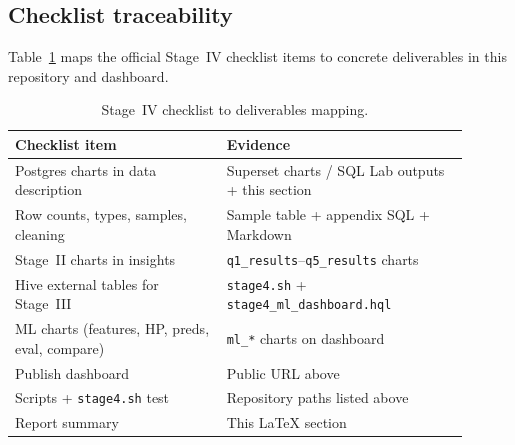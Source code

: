 \subsection{Checklist traceability}
Table~\ref{tab:stage4-checklist} maps the official Stage~IV checklist items to concrete deliverables in this repository and dashboard.

\begin{table}[htbp]
  \centering
  \begin{tabular}{p{0.42\linewidth}p{0.48\linewidth}}
    \toprule
    Checklist item & Evidence \\
    \midrule
    Postgres charts in data description & Superset charts / SQL Lab outputs + this section \\
    Row counts, types, samples, cleaning & Sample table + appendix SQL + Markdown \\
    Stage~II charts in insights & \texttt{q1\_results}--\texttt{q5\_results} charts \\
    Hive external tables for Stage~III & \texttt{stage4.sh} + \texttt{stage4\_ml\_dashboard.hql} \\
    ML charts (features, HP, preds, eval, compare) & \texttt{ml\_*} charts on dashboard \\
    Publish dashboard & Public URL above \\
    Scripts + \texttt{stage4.sh} test & Repository paths listed above \\
    Report summary & This \LaTeX{} section \\
    \bottomrule
  \end{tabular}
  \caption{Stage~IV checklist to deliverables mapping.}
  \label{tab:stage4-checklist}
\end{table}

